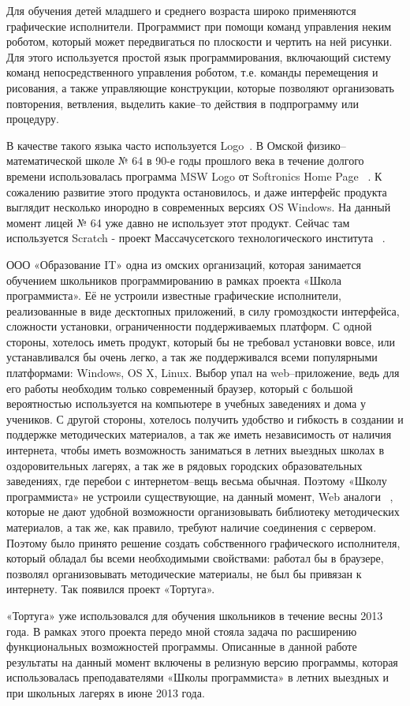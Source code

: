 Для обучения детей младшего и среднего возраста широко применяются графические исполнители. Программист при помощи команд управления неким роботом, который может передвигаться по плоскости и чертить на ней рисунки. Для этого используется простой язык программирования, включающий систему команд непосредственного управления роботом, т.е. команды перемещения и рисования, а также управляющие конструкции, которые позволяют организовать повторения, ветвления, выделить какие–то действия в подпрограмму или процедуру.\par
В качестве такого языка часто используется Logo~\cite{shaposhnicow}. В Омской физико–математической школе № 64 в 90-е годы прошлого века в течение долгого времени использовалась программа MSW Logo от Softronics Home Page ~\cite{logo}. К сожалению развитие этого продукта остановилось, и даже интерфейс продукта выглядит несколько инородно в современных версиях OS Windows. На данный момент лицей № 64 уже давно не использует этот продукт. Сейчас там используется Scratch - проект Массачусетского технологического института ~\cite{scratch}.\par
ООО «Образование IT» одна из омских организаций, которая занимается обучением школьников программированию в рамках проекта «Школа программиста». Её не устроили известные графические исполнители, реализованные в виде десктопных приложений, в силу громоздкости интерфейса, сложности установки, ограниченности поддерживаемых платформ. С одной стороны, хотелось иметь продукт, который бы не требовал установки вовсе, или устанавливался бы очень легко, а так же поддерживался всеми популярными платформами: Windows, OS X, Linux. Выбор упал на web–приложение, ведь для его работы необходим только современный браузер, который с большой вероятностью используется на компьютере в учебных заведениях и дома у учеников. С другой стороны, хотелось получить удобство и гибкость в создании и поддержке методических материалов, а так же иметь независимость от наличия интернета, чтобы иметь возможность заниматься в летних выездных школах в оздоровительных лагерях, а так же в рядовых городских образовательных заведениях, где перебои с интернетом–вещь весьма обычная. Поэтому «Школу программиста» не устроили существующие, на данный момент, Web аналоги ~\cite{blockly,codecademy,kodu,appinventor,alice,onlibelogo,logointerpr,logotortoise,tortuelogo,papert,}, которые не дают удобной возможности организовывать библиотеку методических материалов, а так же, как правило, требуют наличие соединения с сервером. Поэтому было принято решение создать собственного графического исполнителя, который обладал бы всеми необходимыми свойствами: работал бы в браузере, позволял организовывать методические материалы, не был бы привязан к интернету. Так появился проект «Тортуга».\par
«Тортуга» уже использовался для обучения школьников в течение весны 2013 года. В рамках этого проекта передо мной стояла задача по расширению функциональных возможностей программы. Описанные в данной работе результаты на данный момент включены в релизную версию программы, которая использовалась преподавателями «Школы программиста» в летних выездных и при школьных лагерях в июне 2013 года.


\clearpage